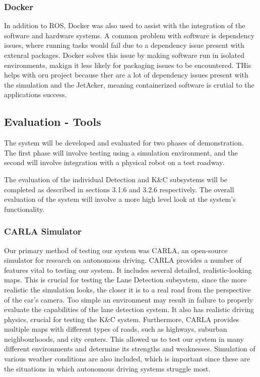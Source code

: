 \documentclass[titlepage,draft]{article}
\begin{document}
{\subsubsection{Docker}
In addition to ROS, Docker was also used to assist with the integration of the software and hardware systems. A common problem with software is dependency issues, where running tasks would fail due to a dependency issue present with extenral packages. Docker solves this issue by making software run in isolated environments, makign it less likely for packaging issues to be encountered. THis helps with oru project because ther are a lot of dependency issues present with the simulation and the JetAcker, meaning containerized software is crutial to the applications success.


\subsection{Evaluation - Tools}
The system will be developed and evaluated for two phases of demonstration. The first phase will involve testing using a simulation environment, and the second will involve integration with a physical robot on a test roadway.

The evaluation of the individual Detection and K\&C subsystems will be completed as described in sections 3.1.6 and 3.2.6 respectively. The overall evaluation of the system will involve a more high level look at the system’s functionality.

\subsubsection{CARLA Simulator}
Our primary method of testing our system was CARLA, an open-source simulator for research on autonomous driving. CARLA provides a number of features vital to testing our system. It includes several detailed, realistic-looking maps. This is crucial for testing the Lane Detection subsystem, since the more realistic the simulation looks, the closer it is to a real road from the perspective of the car's camera. Too simple an environment may result in failure to properly evaluate the capabilities of the lane detection system. It also has realistic driving physics, crucial for testing the K\&C system. Furthermore, CARLA provides multiple maps with different types of roads, such as highways, suburban neighbourhoods, and city centers. This allowed us to test our system in many different environments and determine its strengths and weaknesses. Simulation of various weather conditions are also included, which is important since these are the situations in which autonomous driving systems struggle most.

}
\end{document}
